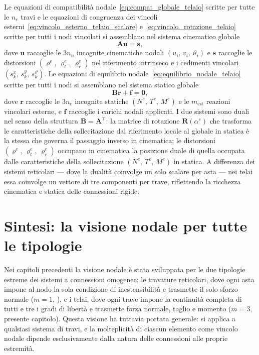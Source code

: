 Le equazioni di compatibilità
nodale~\eqref{eq:compat_globale_telaio} scritte
per tutte le $n_e$ travi e le equazioni di congruenza
dei vincoli esterni~\eqref{eq:vincolo_esterno_telaio_scalare}
e~\eqref{eq:vincolo_rotazione_telaio} scritte per
tutti i nodi vincolati si assemblano nel sistema
cinematico globale
\[
\bm{A}\bm{u} = \bm{s},
\]
dove $\bm{u}$ raccoglie le $3n_n$ incognite
cinematiche nodali $(u_i,\, v_i,\, \vartheta_i)$
e $\bm{s}$ raccoglie le distorsioni
$(\varrho^e,\, \varrho^e_t,\, \varrho^e_r)$ nel
riferimento intrinseco e i cedimenti vincolari
$(s_k^x,\, s_k^y,\, s_k^\vartheta)$.
Le equazioni di equilibrio
nodale~\eqref{eq:equilibrio_nodale_telaio}
scritte per tutti i nodi si assemblano nel sistema
statico globale
\[
\bm{B}\bm{r} + \bm{f} = \bm{0},
\]
dove $\bm{r}$ raccoglie le $3n_e$ incognite statiche
$(N^e,\, T^e,\, M^e)$ e le $m_\text{est}$ reazioni
vincolari esterne, e $\bm{f}$ raccoglie i carichi
nodali applicati.
I due sistemi sono duali nel senso della struttura
$\bm{B} = \bm{A}^\top$: la matrice di rotazione
$\bm{R}(\alpha^e)$ che trasforma le caratteristiche
della sollecitazione dal riferimento locale al
globale in statica è la stessa che governa il
passaggio inverso in cinematica; le distorsioni
$(\varrho^e,\, \varrho^e_t,\, \varrho^e_r)$ occupano
in cinematica la posizione duale di quella occupata
dalle caratteristiche della sollecitazione
$(N^e,\, T^e,\, M^e)$ in statica.
A differenza dei sistemi reticolari --- dove
la dualità coinvolge un solo scalare per asta ---
nei telai essa coinvolge un vettore di tre componenti
per trave, riflettendo la ricchezza cinematica
e statica delle connessioni rigide.



\section{Sintesi: la visione nodale per tutte le tipologie}
\label{sec:telai_sintesi_nodale}

Nei capitoli precedenti la visione nodale è stata
sviluppata per le due tipologie estreme dei sistemi
a connessioni omogenee: le travature reticolari,
dove ogni asta impone al nodo la sola condizione
di inestensibilità e trasmette il solo sforzo
normale ($m = 1$, ), e i
telai, dove ogni trave impone la continuità completa
di tutti e tre i gradi di libertà e trasmette forza
normale, taglio e momento ($m = 3$, presente
capitolo). Questa visione ha tuttavia portata
generale: si applica a qualsiasi sistema di travi,
e la molteplicità di ciascun elemento come vincolo
nodale dipende esclusivamente dalla natura delle
connessioni alle proprie estremità.

